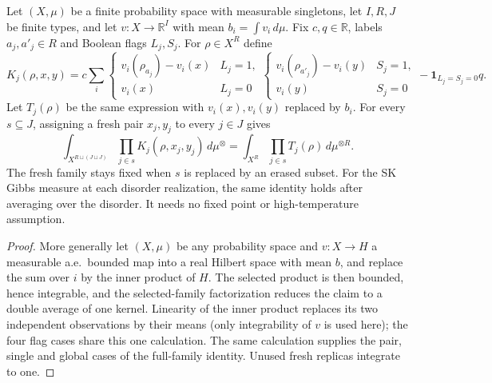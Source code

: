 \begin{lemma}
\label{lem:sg-tal:flagged-fresh-subsets}
\leanok
{}
Let $(X,\mu)$ be a finite probability space with measurable singletons, let $I,R,J$
be finite types, and let $v:X\to\mathbb R^I$ with mean $b_i=\int v_i\,d\mu$.
Fix $c,q\in\mathbb R$, labels $a_j,a'_j\in R$ and Boolean flags $L_j,S_j$.
For $\rho\in X^R$ define
\[
 K_j(\rho,x,y)=c\sum_i
  \begin{cases}v_i(\rho_{a_j})-v_i(x)&L_j=1,\\v_i(x)&L_j=0\end{cases}
  \begin{cases}v_i(\rho_{a'_j})-v_i(y)&S_j=1,\\v_i(y)&S_j=0\end{cases}
  -\mathbf1_{L_j=S_j=0}q.
\]
Let $T_j(\rho)$ be the same expression with $v_i(x),v_i(y)$ replaced by $b_i$.
For every $s\subseteq J$, assigning a fresh pair $x_j,y_j$ to every $j\in J$ gives
\[
 \int_{X^{R\sqcup(J\sqcup J)}}\prod_{j\in s}K_j(\rho,x_j,y_j)\,d\mu^{\otimes}
 =\int_{X^R}\prod_{j\in s}T_j(\rho)\,d\mu^{\otimes R}.
\]
The fresh family stays fixed when $s$ is replaced by an erased subset.
For the SK Gibbs measure at each disorder realization, the same identity holds after
averaging over the disorder. It needs no fixed point or high-temperature assumption.
\end{lemma}
\begin{proof}
\leanok
More generally let $(X,\mu)$ be any probability space and $v:X\to H$ a measurable a.e.\ bounded map
into a real Hilbert space with mean $b$, and replace the sum over $i$ by the inner product of $H$.
The selected product is then bounded, hence integrable, and the selected-family factorization
reduces the claim to a double average of one kernel. Linearity of the inner product replaces its two
independent observations by their means (only integrability of $v$ is used here);
the four flag cases share this one calculation. The same calculation supplies
the pair, single and global cases of the full-family identity. Unused fresh replicas integrate to one.
\end{proof}

